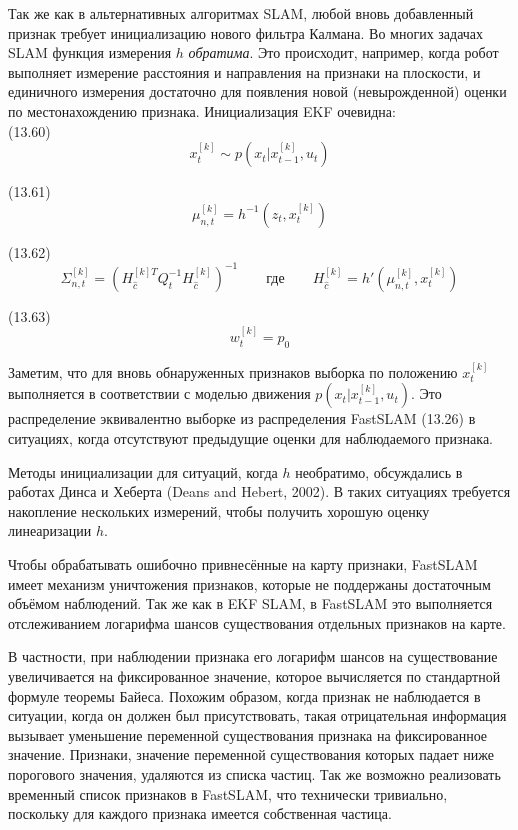 \documentclass[10pt,a4paper]{article}
\begin{document}
Так же как в альтернативных алгоритмах SLAM, любой вновь добавленный признак требует инициализацию нового фильтра Калмана. Во многих задачах SLAM функция измерения $h$ \textit{обратима}. Это происходит, например, когда робот выполняет измерение расстояния и направления на признаки на плоскости, и единичного измерения достаточно для появления новой (невырожденной) оценки по местонахождению признака. Инициализация EKF очевидна:\\

(13.60)
$$x_t^{[k]}\sim p(x_t|x_{t-1}^{[k]},u_t)$$

(13.61)
$$\mu_{n,t}^{[k]}=h^{-1}(z_t,x_t^{[k]})$$

(13.62)
$$\varSigma_{n,t}^{[k]}=(H_{\hat{c}}^{[k]T}Q_t^{-1}H_{\hat{c}}^{[k]})^{-1}\qquad\text{где}\qquad H_{\hat{c}}^{[k]}=h'(\mu_{n,t}^{[k]},x_t^{[k]})$$

(13.63)
$$w_t^{[k]}=p_0$$

Заметим, что для вновь обнаруженных признаков выборка по положению $x_t^{[k]}$ выполняется в соответствии с моделью движения $p(x_t|x_{t-1}^{[k]}, u_t)$. Это распределение эквивалентно выборке из распределения FastSLAM (13.26) в ситуациях, когда отсутствуют предыдущие оценки для наблюдаемого признака.

Методы инициализации для ситуаций, когда $h$ необратимо, обсуждались в работах Динса и Хеберта (Deans and Hebert, 2002). В таких ситуациях требуется накопление нескольких измерений, чтобы получить хорошую оценку линеаризации $h$.

Чтобы обрабатывать ошибочно привнесённые на карту признаки, FastSLAM имеет механизм уничтожения признаков, которые не поддержаны достаточным объёмом наблюдений. Так же как в EKF SLAM, в FastSLAM это выполняется отслеживанием логарифма шансов существования отдельных признаков на карте.

В частности, при наблюдении признака его логарифм шансов на существование увеличивается на фиксированное значение, которое вычисляется по стандартной формуле теоремы Байеса. Похожим образом, когда признак не наблюдается в ситуации, когда он должен был присутствовать, такая отрицательная информация вызывает уменьшение переменной существования признака на фиксированное значение. Признаки, значение переменной существования которых падает ниже порогового значения, удаляются из списка частиц. Так же возможно реализовать временный список признаков в FastSLAM, что технически тривиально, поскольку для каждого признака имеется собственная частица.\\
\end{document}
